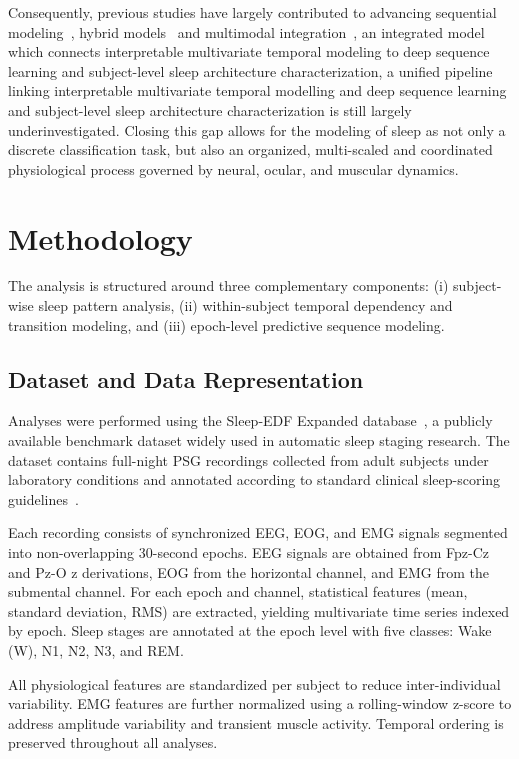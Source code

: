 \documentclass[10pt]{cai26}
\begin{document}
Consequently, previous studies have largely contributed to advancing sequential modeling~\cite{Supratak2017,Phan2019}, 
hybrid models~\cite{Pham2023,Phan2019J,Wang2020,Chang2022} and multimodal integration~\cite{Chambon2018,Karim2025,Phan2022,Wang2024}, 
an integrated model which connects interpretable 
multivariate temporal modeling to deep sequence learning and subject-level sleep architecture characterization, a unified 
pipeline linking interpretable multivariate temporal modelling and deep sequence learning and subject-level sleep architecture 
characterization is still largely underinvestigated. Closing this gap allows for the modeling of sleep as not only a discrete 
classification task, but also an organized, multi-scaled and coordinated physiological process governed by neural, ocular, and 
muscular dynamics.

\section{Methodology}
\label{method}
The analysis is structured around three complementary components: (i) subject-wise sleep pattern analysis, (ii) within-subject temporal dependency and transition 
modeling, and (iii) epoch-level predictive sequence modeling.

\subsection{Dataset and Data Representation}

Analyses were performed using the Sleep-EDF Expanded database~\cite{Kemp2000SleepEDF,Goldberger2000PhysioNet}, a publicly available benchmark dataset widely used in automatic sleep staging research. The 
dataset contains full-night PSG recordings collected from adult subjects under laboratory conditions and annotated according to standard clinical sleep-scoring 
guidelines~\cite{AASM2014}.

Each recording consists of synchronized EEG, EOG, and EMG signals segmented into non-overlapping 30-second epochs. EEG signals are obtained from Fpz-Cz and Pz-O
z derivations, EOG from the horizontal channel, and EMG from the submental channel. For each epoch and channel, statistical features (mean, standard deviation, RMS) are 
extracted, yielding multivariate time series indexed by epoch. Sleep stages are annotated at the epoch level with five classes: Wake (W), N1, N2, N3, and REM.

All physiological features are standardized per subject to reduce inter-individual variability. EMG features are further normalized using a rolling-window z-score to 
address amplitude variability and transient muscle activity. Temporal ordering is preserved throughout all analyses.
\end{document}
